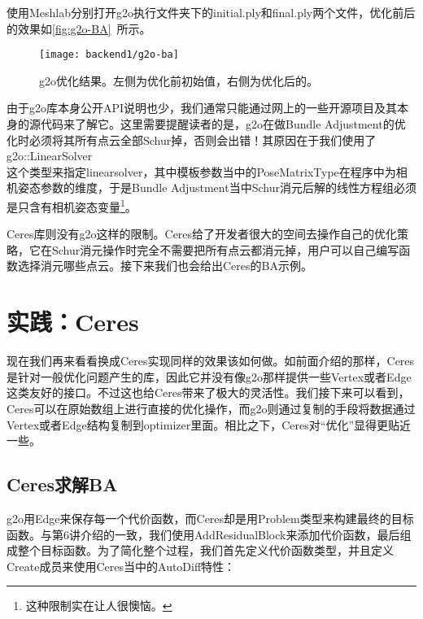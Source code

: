 \clearpage
使用Meshlab分别打开g2o执行文件夹下的initial.ply和final.ply两个文件，优化前后的效果如\autoref{fig:g2o-BA}~所示。

\begin{figure}[!htp]
	\centering
	\texttt{[image: backend1/g2o-ba]}
	\caption{g2o优化结果。左侧为优化前初始值，右侧为优化后的。}
	\label{fig:g2o-BA}
\end{figure}

由于g2o库本身公开API说明也少，我们通常只能通过网上的一些开源项目及其本身的源代码来了解它。这里需要提醒读者的是，g2o在做Bundle Adjustment的优化时必须将其所有点云全部Schur掉，否则会出错！其原因在于我们使用了g2o::LinearSolver\\<BalBlockSolver::PoseMatrixType>这个类型来指定linearsolver，其中模板参数当中的PoseMatrixType在程序中为相机姿态参数的维度，于是Bundle Adjustment当中Schur消元后解的线性方程组必须是只含有相机姿态变量\footnote{这种限制实在让人很懊恼。}。

Ceres库则没有g2o这样的限制。Ceres给了开发者很大的空间去操作自己的优化策略，它在Schur消元操作时完全不需要把所有点云都消元掉，用户可以自己编写函数选择消元哪些点云。接下来我们也会给出Ceres的BA示例。

\section{实践：Ceres}

现在我们再来看看换成Ceres实现同样的效果该如何做。如前面介绍的那样，Ceres是针对一般优化问题产生的库，因此它并没有像g2o那样提供一些Vertex或者Edge这类友好的接口。不过这也给Ceres带来了极大的灵活性。我们接下来可以看到，Ceres可以在原始数组上进行直接的优化操作，而g2o则通过复制的手段将数据通过Vertex或者Edge结构复制到optimizer里面。相比之下，Ceres对“优化”显得更贴近一些。

\subsection{Ceres求解BA}
g2o用Edge来保存每一个代价函数，而Ceres却是用Problem类型来构建最终的目标函数。与第6讲介绍的一致，我们使用AddResidualBlock来添加代价函数，最后组成整个目标函数。为了简化整个过程，我们首先定义代价函数类型，并且定义Create成员来使用Ceres当中的AutoDiff特性：

